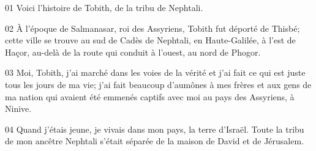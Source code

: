 01 Voici l’histoire de Tobith, de la tribu de Nephtali.

02 À l’époque de Salmanasar, roi des Assyriens, Tobith fut déporté de Thisbé; cette ville se trouve au sud de Cadès de Nephtali, en Haute-Galilée, à l’est de Haçor, au-delà de la route qui conduit à l’ouest, au nord de Phogor.

03 Moi, Tobith, j’ai marché dans les voies de la vérité et j’ai fait ce qui est juste tous les jours de ma vie; j’ai fait beaucoup d’aumônes à mes frères et aux gens de ma nation qui avaient été emmenés captifs avec moi au pays des Assyriens, à Ninive.

04 Quand j’étais jeune, je vivais dans mon pays, la terre d’Israël. Toute la tribu de mon ancêtre Nephtali s’était séparée de la maison de David et de Jérusalem.
